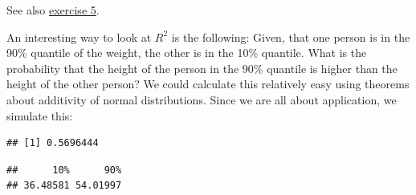 \documentclass[
]{book}
\newenvironment{Shaded}{\begin{snugshade}}{\end{snugshade}}
\newcommand{\AttributeTok}[1]{\textcolor[rgb]{0.13,0.29,0.53}{#1}}
\newcommand{\CommentTok}[1]{\textcolor[rgb]{0.56,0.35,0.01}{\textit{#1}}}
\newcommand{\DecValTok}[1]{\textcolor[rgb]{0.00,0.00,0.81}{#1}}
\newcommand{\FloatTok}[1]{\textcolor[rgb]{0.00,0.00,0.81}{#1}}
\newcommand{\FunctionTok}[1]{\textcolor[rgb]{0.13,0.29,0.53}{\textbf{#1}}}
\newcommand{\NormalTok}[1]{#1}
\newcommand{\OtherTok}[1]{\textcolor[rgb]{0.56,0.35,0.01}{#1}}
\newcommand{\SpecialCharTok}[1]{\textcolor[rgb]{0.81,0.36,0.00}{\textbf{#1}}}
\begin{document}
See also \hyperref[exercise5_simpl_lin_reg]{exercise 5}.

An interesting way to look at \(R^2\) is the following:
Given, that one person is in the 90\% quantile of the weight,
the other is in the 10\% quantile. What is the probability that the
height of the person in the 90\% quantile is higher than the height of the other person?
We could calculate this relatively easy using theorems about additivity of normal distributions.
Since we are all about application, we simulate this:

\begin{Shaded}
\end{Shaded}

\begin{verbatim}
## [1] 0.5696444
\end{verbatim}

\begin{Shaded}
\end{Shaded}

\begin{verbatim}
##      10%      90% 
## 36.48581 54.01997
\end{verbatim}
\end{document}
